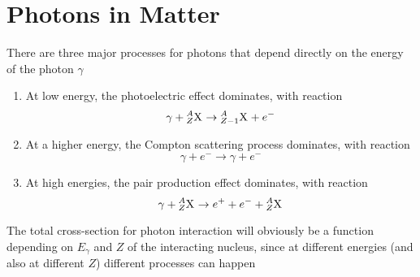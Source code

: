 \documentclass[../qm.tex]{subfiles}
\begin{document}
\section{Photons in Matter}
There are three major processes for photons that depend directly on the energy of the photon $\gamma$
\begin{enumerate}
\item At low energy, the photoelectric effect dominates, with reaction
	\begin{equation}
		\gamma+\nuc{X}{A}{Z}\to\nuc{X}{A}{Z-1}+e^-
		\label{eq:photoelectriceffectreac}
	\end{equation}
\item At a higher energy, the Compton scattering process dominates, with reaction
	\begin{equation}
		\gamma+e^-\to\gamma+e^-
		\label{eq:comptonscattergee}
	\end{equation}
\item At high energies, the pair production effect dominates, with reaction
	\begin{equation}
		\gamma+\nuc{X}{A}{Z}\to e^++e^-+\nuc{X}{A}{Z}
		\label{eq:pairproduction}
	\end{equation}
\end{enumerate}
The total cross-section for photon interaction will obviously be a function depending on $E_\gamma$ and $Z$ of the interacting nucleus, since at different energies (and also at different $Z$) different processes can happen
\end{document}
